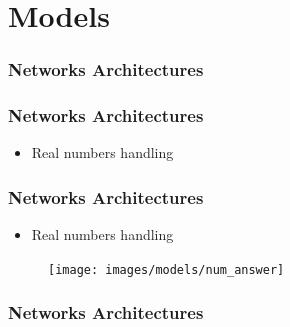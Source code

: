 \documentclass[18pt]{beamer}
\begin{document}
\section{Models}

\begin{frame}[t]
  \frametitle{Networks Architectures}
\end{frame}

\begin{frame}[t]
  \frametitle{Networks Architectures}
  \begin{itemize}
  \item Real numbers handling
  \end{itemize}
\end{frame}

\begin{frame}[t]
  \frametitle{Networks Architectures}
  \begin{itemize}
  \item Real numbers handling
  \end{itemize}
  \begin{center}
    \begin{figure}[htb]
      \texttt{[image: images/models/num\_answer]}
    \end{figure}  
  \end{center}
\end{frame}

\begin{frame}[t]
  \frametitle{Networks Architectures}
\end{frame}
\end{document}
